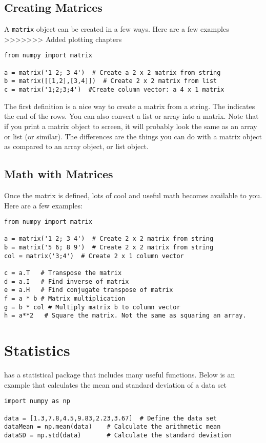 \subsection*{Creating Matrices}
A \texttt{matrix} object can be created in a
few ways.  Here are a few examples
>>>>>>> Added plotting chapters
\begin{Verbatim}
from numpy import matrix

a = matrix('1 2; 3 4')  # Create a 2 x 2 matrix from string
b = matrix([[1,2],[3,4]])  # Create 2 x 2 matrix from list
c = matrix('1;2;3;4')  #Create column vector: a 4 x 1 matrix
\end{Verbatim}
The first definition is a nice way to create a matrix from a string.
The \code{;} indicates the end of the rows.  You can also convert a
list or array into a matrix.  Note that if you print a matrix object
to screen, it will probably look the same as an array or list (or
similar).  The differences are the things you can do with a matrix
object as compared to an array object, or list object.

\subsection*{Math with Matrices}
Once the matrix is defined, lots of cool and useful math becomes
available to you.  Here are a few examples:

\begin{Verbatim}
from numpy import matrix

a = matrix('1 2; 3 4')  # Create 2 x 2 matrix from string
b = matrix('5 6; 8 9')  # Create 2 x 2 matrix from string
col = matrix('3;4')  # Create 2 x 1 column vector

c = a.T   # Transpose the matrix
d = a.I   # Find inverse of matrix
e = a.H   # Find conjugate transpose of matrix
f = a * b # Matrix multiplication
g = b * col # Multiply matrix b to column vector
h = a**2   # Square the matrix. Not the same as squaring an array.
\end{Verbatim}
 

\section{Statistics}
 has a statistical package that includes many useful
functions.  Below is an example that calculates the mean and standard
deviation of a data set
\begin{Verbatim}
import numpy as np

data = [1.3,7.8,4.5,9.83,2.23,3.67]  # Define the data set
dataMean = np.mean(data)    # Calculate the arithmetic mean
dataSD = np.std(data)       # Calculate the standard deviation
\end{Verbatim}

